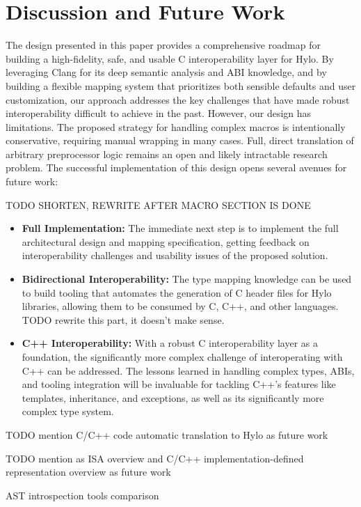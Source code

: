 \section{Discussion and Future Work}

The design presented in this paper provides a comprehensive roadmap for building a high-fidelity, safe, and usable C interoperability layer for Hylo. By leveraging Clang for its deep semantic analysis and ABI knowledge, and by building a flexible mapping system that prioritizes both sensible defaults and user customization, our approach addresses the key challenges that have made robust interoperability difficult to achieve in the past.
However, our design has limitations. The proposed strategy for handling complex macros is intentionally conservative, requiring manual wrapping in many cases. Full, direct translation of arbitrary preprocessor logic remains an open and likely intractable research problem.
The successful implementation of this design opens several avenues for future work:


TODO SHORTEN, REWRITE AFTER MACRO SECTION IS DONE
\begin{itemize}
    \item \textbf{Full Implementation:} The immediate next step is to implement the full architectural design and mapping specification, getting feedback on interoperability challenges and usability issues of the proposed solution.
    \item \textbf{Bidirectional Interoperability:} The type mapping knowledge can be used to build tooling that automates the generation of C header files for Hylo libraries, allowing them to be consumed by C, C++, and other languages. TODO rewrite this part, it doesn't make sense.
    \item \textbf{C++ Interoperability:} With a robust C interoperability layer as a foundation, the significantly more complex challenge of interoperating with C++ can be addressed. The lessons learned in handling complex types, ABIs, and tooling integration will be invaluable for tackling C++'s features like templates, inheritance, and exceptions, as well as its significantly more complex type system.
\end{itemize}

TODO mention C/C++ code automatic translation to Hylo as future work

TODO mention as ISA overview and C/C++ implementation-defined representation overview as future work

AST introspection tools comparison
